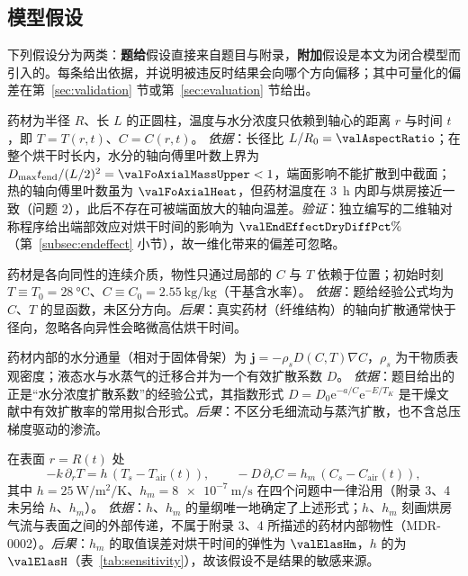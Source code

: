 \subsection{模型假设}
下列假设分为两类：\textbf{题给}假设直接来自题目与附录，\textbf{附加}假设是本文为闭合模型而引入的。每条给出依据，并说明被违反时结果会向哪个方向偏移；其中可量化的偏差在第~\ref{sec:validation} 节或第~\ref{sec:evaluation} 节给出。

\begin{assumption}[圆柱几何与一维径向化，附加]\label{as:1d}
药材为半径 $R$、长 $L$ 的正圆柱，温度与水分浓度只依赖到轴心的距离 $r$ 与时间 $t$，即 $T=T(r,t)$、$C=C(r,t)$。
\emph{依据}：长径比 $L/R_0=\valAspectRatio$；在整个烘干时长内，水分的轴向傅里叶数上界为 $D_{\max}t_{\mathrm{end}}/(L/2)^2=\valFoAxialMassUpper<1$，端面影响不能扩散到中截面；热的轴向傅里叶数虽为 $\valFoAxialHeat$，但药材温度在 \SI{3}{\hour} 内即与烘房接近一致（问题 2），此后不存在可被端面放大的轴向温差。\emph{验证}：独立编写的二维轴对称程序给出端部效应对烘干时间的影响为 $\valEndEffectDryDiffPct\%$（第~\ref{subsec:endeffect} 小节），故一维化带来的偏差可忽略。
\end{assumption}

\begin{assumption}\label{as:medium}
药材是各向同性的连续介质，物性只通过局部的 $C$ 与 $T$ 依赖于位置；初始时刻 $T\equiv T_0=\SI{28}{\celsius}$、$C\equiv C_0=\SI{2.55}{\kilo\gram\per\kilo\gram}$（干基含水率）。
\emph{依据}：题给经验公式均为 $C$、$T$ 的显函数，未区分方向。\emph{后果}：真实药材（纤维结构）的轴向扩散通常快于径向，忽略各向异性会略微高估烘干时间。
\end{assumption}

\begin{assumption}\label{as:fick}
药材内部的水分通量（相对于固体骨架）为 $\bm j=-\rho_s D(C,T)\nabla C$，$\rho_s$ 为干物质表观密度；液态水与水蒸气的迁移合并为一个有效扩散系数 $D$。
\emph{依据}：题目给出的正是“水分浓度扩散系数”的经验公式，其指数形式 $D=D_0\mathrm{e}^{-a/C}\mathrm{e}^{-E/T_K}$ 是干燥文献中有效扩散率的常用拟合形式\cite{zogzas1996,mujumdar2014}。\emph{后果}：不区分毛细流动与蒸汽扩散，也不含总压梯度驱动的渗流\cite{whitaker1977}。
\end{assumption}

\begin{assumption}\label{as:boundary}
在表面 $r=R(t)$ 处
\[-k\,\partial_r T=h\,(T_s-T_{\mathrm{air}}(t)),\qquad -D\,\partial_r C=h_m\,(C_s-C_{\mathrm{air}}(t)),\]
其中 $h=\SI{25}{\watt\per\square\meter\per\kelvin}$、$h_m=\SI{8e-7}{\meter\per\second}$ 在四个问题中一律沿用（附录 3、4 未另给 $h$、$h_m$）。
\emph{依据}：$h$、$h_m$ 的量纲唯一地确定了上述形式；$h$、$h_m$ 刻画烘房气流与表面之间的外部传递，不属于附录 3、4 所描述的药材内部物性（MDR-0002）。\emph{后果}：$h_m$ 的取值误差对烘干时间的弹性为 $\valElasHm$，$h$ 的为 $\valElasH$（表~\ref{tab:sensitivity}），故该假设不是结果的敏感来源。
\end{assumption}

